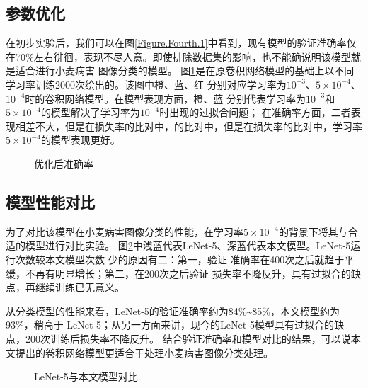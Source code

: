   \subsection{\hei\xiaosan\textbf{参数优化}}
    在初步实验后，我们可以在图\ref{Figure.Fourth.1}中看到，现有模型的验证准确率仅
    在70\%左右徘徊，表现不尽人意。即使排除数据集的影响，也不能确说明该模型就是适合进行小麦病害
    图像分类的模型。
    图\ref{Figure.Fourth.2}是在原卷积网络模型的基础上以不同学习率训练2000次绘出的。该图中橙、蓝、红
    分别对应学习率为$10^{-3}$、$5\times10^{-4}$、$10^{-4}$时的卷积网络模型。在模型表现方面，橙、蓝
    分别代表学习率为$10^{-3}$和$5\times10^{-4}$的模型解决了学习率为$10^{-4}$时出现的过拟合问题；
    在准确率方面，二者表现相差不大，但是在损失率的比对中，的比对中，但是在损失率的比对中，学习率
    $5\times10^{-4}$的模型表现更好。



    \begin{figure}[H]
      \centering
      \caption{优化后准确率}
      \label{Figure.Fourth.2}
    \end{figure}

  \subsection{\hei\xiaosan\textbf{模型性能对比}}

    为了对比该模型在小麦病害图像分类的性能，在学习率$5\times10^{-4}$的背景下将其与合适的模型进行对比实验。
    图\ref{Figure.Fourth.3}中浅蓝代表LeNet-5、深蓝代表本文模型。LeNet-5运行次数较本文模型次数
    少的原因有二：第一，验证 准确率在400次之后就趋于平缓，不再有明显增长；第二，在200次之后验证
    损失率不降反升，具有过拟合的缺点，再继续训练已无意义。

    从分类模型的性能来看，LeNet-5的验证准确率约为84\%\textasciitilde85\%，本文模型约为93\%，稍高于
    LeNet-5；从另一方面来讲，现今的LeNet-5模型具有过拟合的缺点，200次训练后损失率不降反升。
    结合验证准确率和模型对比的结果，可以说本文提出的卷积网络模型更适合于处理小麦病害图像分类处理。

    \begin{figure}[H]
      \centering
      \caption{LeNet-5与本文模型对比}
      \label{Figure.Fourth.3}
    \end{figure}


